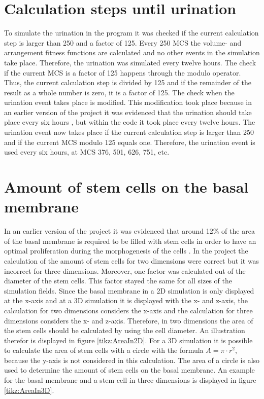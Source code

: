 \section{Calculation steps until urination}\label{sec:calculationStpesUntilUrination}
To simulate the urination in the program it was checked if the current calculation step is larger than 250 and a factor of 125. Every 250 \ac{MCS} the volume- and arrangement fitness functions are calculated and no other events in the simulation take place. Therefore, the urination was simulated every twelve hours. The check if the current \ac{MCS} is a factor of 125 happens through the modulo operator. Thus, the current calculation step is divided by 125 and if the remainder of the result as a whole number is zero, it is a factor of 125. \newline
The check when the urination event takes place is modified. This modification took place because in an earlier version of the project it was evidenced that the urination should take place every six hours \cite{Torelli2017}, but within the code it took place every twelve hours. The urination event now takes place if the current calculation step is larger than 250 and if the current \ac{MCS} modulo 125 equals one. Therefore, the urination event is used every six hours, at \ac{MCS} 376, 501, 626, 751, etc.


\section{Amount of stem cells on the basal membrane}\label{sec:AmountStemCellsBasalMembrane}
In an earlier version of the project it was evidenced that around 12\% of the area of the basal membrane is required to be filled with stem cells in order to have an optimal proliferation during the morphogenesis of the cells \cite{Torelli2017}.
In the project the calculation of the amount of stem cells for two dimensions were correct but it was incorrect for three dimensions. Moreover, one factor was calculated out of the diameter of the stem cells. This factor stayed the same for all sizes of the simulation fields. \newline
Since the basal membrane in a 2D simulation is only displayed at the x-axis and at a 3D simulation it is displayed with the x- and z-axis, the calculation for two dimensions considers the x-axis and the calculation for three dimensions considers the x- and z-axis. Therefore, in two dimensions the area of the stem cells should be calculated by using the cell diameter. An illustration therefor is displayed in figure \ref{tikz:AreaIn2D}. For a 3D simulation it is possible to calculate the area of stem cells with a circle with the formula $A = \pi \cdot r^{2}$, because the y-axis is not considered in this calculation. The area of a circle is also used to determine the amount of stem cells on the basal membrane. An example for the basal membrane and a stem cell in three dimensions is displayed in figure \ref{tikz:AreaIn3D}. 

